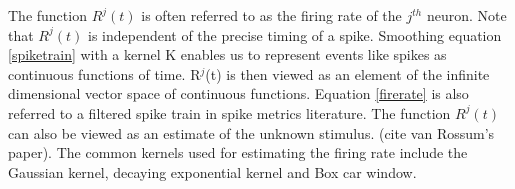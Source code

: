The function $R^{j}(t)$ is often referred to as the firing rate of the $j^{th}$ neuron. 
Note that $R^{j}(t)$ is independent of the precise timing of a spike.
Smoothing equation \eqref{spiketrain} with a kernel K enables us to represent events like spikes as continuous functions of time. R$^{j}$(t) is then viewed as an element of the infinite dimensional vector space of continuous functions.  Equation \eqref{firerate} 
is also referred to a filtered spike train in spike metrics literature.
The function $R^{j}(t)$ can also be viewed as an estimate of the unknown stimulus.
(cite van Rossum's paper). 
The common kernels used for estimating the firing rate include the Gaussian kernel,  decaying exponential kernel and Box car window.








































%







